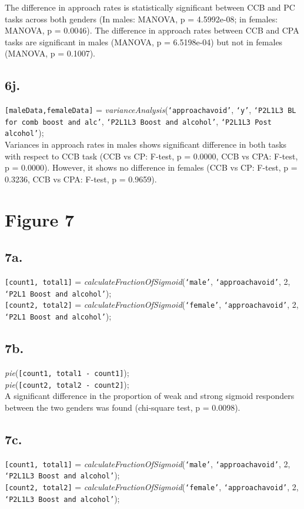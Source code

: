 \documentclass{article}
\begin{document}
The difference in approach rates is statistically significant between CCB and PC tasks across both genders (In males: MANOVA, p = 4.5992e-08; in females: MANOVA, p = 0.0046). The difference in approach rates between CCB and CPA tasks are significant in males (MANOVA, p = 6.5198e-04) but not in females (MANOVA, p = 0.1007).

\subsection{6j.}
\texttt{[maleData,femaleData]} = \emph{varianceAnalysis}(\texttt{`approachavoid'}, \texttt{`y'}, \texttt{`P2L1L3 BL for comb boost and alc'}, \texttt{`P2L1L3 Boost and alcohol'}, \texttt{`P2L1L3 Post alcohol'});\\

Variances in approach rates in males shows significant difference in both tasks with respect to CCB task (CCB vs CP: F-test, p = 0.0000, CCB vs CPA: F-test, p = 0.0000).  However, it shows no difference in females (CCB vs CP: F-test, p = 0.3236, CCB vs CPA: F-test, p = 0.9659).

\section{Figure 7}
\subsection{7a.}
\texttt{[count1, total1]} = \emph{calculateFractionOfSigmoid}(\texttt{`male'}, \texttt{`approachavoid'}, 2, \texttt{`P2L1 Boost and alcohol'});\\
\texttt{[count2, total2]} = \emph{calculateFractionOfSigmoid}(\texttt{`female'}, \texttt{`approachavoid'}, 2, \texttt{`P2L1 Boost and alcohol'});\\

\subsection{7b.}
\emph{pie}(\texttt{[count1, total1 - count1]});\\
\emph{pie}(\texttt{[count2, total2 - count2]});\\

A significant difference in the proportion of weak and strong sigmoid responders between the two genders was found (chi-square test, p =  0.0098).

\subsection{7c.}
\texttt{[count1, total1]} = \emph{calculateFractionOfSigmoid}(\texttt{`male'}, \texttt{`approachavoid'}, 2, \texttt{`P2L1L3 Boost and alcohol'});\\
\texttt{[count2, total2]} = \emph{calculateFractionOfSigmoid}(\texttt{`female'}, \texttt{`approachavoid'}, 2, \texttt{`P2L1L3 Boost and alcohol'});\\
\end{document}
